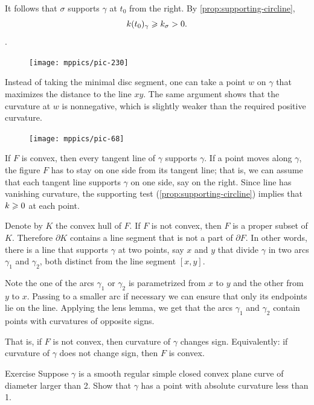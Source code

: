 It follows that $\sigma$ supports $\gamma$ at $t_0$ from the right.
By \ref{prop:supporting-circline}, 
\[k(t_0)_\gamma\geqslant k_\sigma >0.\].
\qeds

\begin{figure}
\vskip-6mm
\centering
\texttt{[image: mppics/pic-230]}
\vskip0mm
\end{figure}

Instead of taking the minimal disc segment, one can take a point $w$ on $\gamma$ that maximizes the distance to the line $xy$.
The same argument shows that the curvature at $w$ is nonnegative, which is slightly weaker than the required positive curvature.

\begin{figure}
\centering
\texttt{[image: mppics/pic-68]}
\vskip0mm
\end{figure}

If $F$ is convex, then every tangent line of $\gamma$ supports $\gamma$.
If a point moves along $\gamma$, the figure $F$ has to stay on one side from its tangent line;
that is, we can assume that each tangent line supports $\gamma$ on one side, say on the right.
Since line has vanishing curvature, the supporting test (\ref{prop:supporting-circline}) implies that $k\geqslant 0$ at each point.

Denote by $K$ the convex hull of $F$.
If $F$ is not convex, then $F$ is a proper subset of $K$.
Therefore $\partial K$ contains a line segment that is not a part of $\partial F$.
In other words, there is a line that supports $\gamma$ at two points, say $x$ and $y$ that divide $\gamma$ in two arcs $\gamma_1$ and $\gamma_2$, both distinct from the line segment $[x,y]$.

Note the one of the arcs $\gamma_1$ or $\gamma_2$ is parametrized from $x$ to $y$ and the other from $y$ to $x$.
Passing to a smaller arc if necessary we can ensure that only its endpoints lie on the line. 
Applying the lens lemma, we get that the arcs $\gamma_1$ and $\gamma_2$ contain points with curvatures of opposite signs.

That is, if $F$ is not convex, then curvature of $\gamma$ changes sign.
Equivalently: if curvature of $\gamma$ does not change sign, then $F$ is convex.
\qeds

\begin{thm}{Exercise}\label{ex:convex small}
Suppose $\gamma$ is a smooth regular simple closed convex plane curve of diameter larger than 2.
Show that $\gamma$ has a point with absolute curvature less than 1.
\end{thm}

